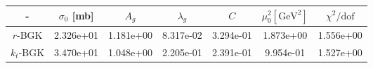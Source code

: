 \begin{tabular}{|c|c|c|c|c|c|c|}
\hline - & $\sigma_0 $ [mb] & $A_g$ & $\lambda_g$ & $C$ & $\mu_0^2 \left[\mathrm{GeV^2}\right]$ & $\chi^2/\mathrm{dof}$ \\\hline 
{\footnotesize $r$-BGK} & 2.326e+01& 1.181e+00& 8.317e-02& 3.294e-01& 1.873e+00& 1.556e+00\\\hline 
{\footnotesize $k_t$-BGK} & 3.470e+01& 1.048e+00& 2.205e-01&2.391e-01& 9.954e-01&  1.527e+00\\\hline 
\end{tabular}